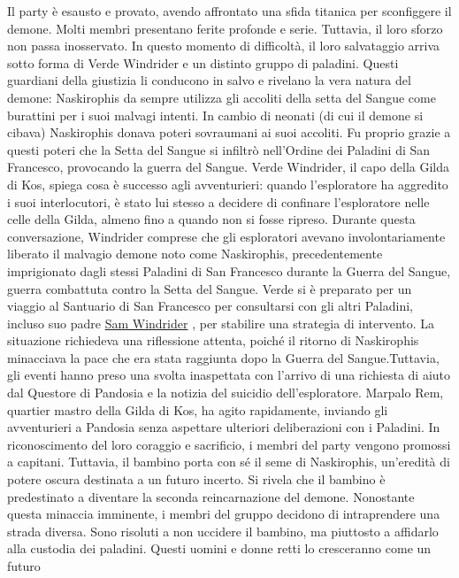 Il party è esausto e provato, avendo affrontato una sfida titanica per
sconfiggere il demone. Molti membri presentano ferite profonde e serie.
Tuttavia, il loro sforzo non passa inosservato. In questo momento di
difficoltà, il loro salvataggio arriva sotto forma di Verde Windrider e
un distinto gruppo di paladini. Questi guardiani della giustizia li
conducono in salvo e rivelano la vera natura del demone: Naskirophis da
sempre utilizza gli accoliti della setta del Sangue come burattini per i
suoi malvagi intenti. In cambio di neonati (di cui il demone si cibava)
Naskirophis donava poteri sovraumani ai suoi accoliti. Fu proprio grazie
a questi poteri che la Setta del Sangue si infiltrò nell'Ordine dei
Paladini di San Francesco, provocando la guerra del Sangue. Verde
Windrider, il capo della Gilda di Kos, spiega cosa è successo agli
avventurieri: quando l'esploratore ha aggredito i suoi interlocutori, è
stato lui stesso a decidere di confinare l'esploratore nelle celle della
Gilda, almeno fino a quando non si fosse ripreso. Durante questa
conversazione, Windrider comprese che gli esploratori avevano
involontariamente liberato il malvagio demone noto come Naskirophis,
precedentemente imprigionato dagli stessi Paladini di San Francesco
durante la Guerra del Sangue, guerra combattuta contro la Setta del
Sangue. Verde si è preparato per un viaggio al Santuario di San
Francesco per consultarsi con gli altri Paladini, incluso suo padre
\href{Sam\%20Windrider\%20568502cb37144ff8990e673a9cd67375.md}{Sam
Windrider} , per stabilire una strategia di intervento. La situazione
richiedeva una riflessione attenta, poiché il ritorno di Naskirophis
minacciava la pace che era stata raggiunta dopo la Guerra del
Sangue.Tuttavia, gli eventi hanno preso una svolta inaspettata con
l'arrivo di una richiesta di aiuto dal Questore di Pandosia e la notizia
del suicidio dell'esploratore. Marpalo Rem, quartier mastro della Gilda
di Kos, ha agito rapidamente, inviando gli avventurieri a Pandosia senza
aspettare ulteriori deliberazioni con i Paladini. In riconoscimento del
loro coraggio e sacrificio, i membri del party vengono promossi a
capitani. Tuttavia, il bambino porta con sé il seme di Naskirophis,
un'eredità di potere oscura destinata a un futuro incerto. Si rivela che
il bambino è predestinato a diventare la seconda reincarnazione del
demone. Nonostante questa minaccia imminente, i membri del gruppo
decidono di intraprendere una strada diversa. Sono risoluti a non
uccidere il bambino, ma piuttosto a affidarlo alla custodia dei
paladini. Questi uomini e donne retti lo cresceranno come un futuro

